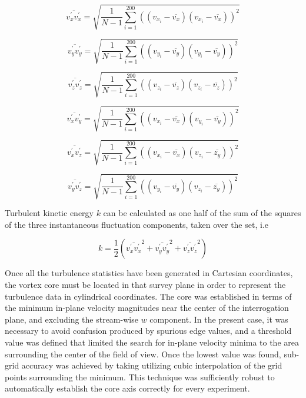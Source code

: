\begin{equation}
\overline{v_x^\prime v_x^\prime} = \sqrt{\frac{1}{N-1} \sum_{i=1}^{200} 
	((v_{x_i} - \overline{v_x})(v_{x_i} - \overline{v_x}))^2}
\label{eq:rs_uu}
\end{equation}

\begin{equation}
\overline{v_y^\prime v_y^\prime} = \sqrt{\frac{1}{N-1} \sum_{i=1}^{200} 
	((v_{y_i} - \overline{v_y})(v_{y_i} - \overline{v_y}))^2}
\end{equation}

\begin{equation}
\overline{v_z^\prime v_z^\prime} = \sqrt{\frac{1}{N-1} \sum_{i=1}^{200} 
	((v_{z_i} - \overline{v_z})(v_{z_i} - \overline{v_z}))^2}
\end{equation}

\begin{equation}
\overline{v_x^\prime v_y^\prime} = \sqrt{\frac{1}{N-1} \sum_{i=1}^{200} 
	((v_{x_i} - \overline{v_x})(v_{y_i} - \overline{v_y}))^2}
\end{equation}

\begin{equation}
\overline{v_x^\prime v_z^\prime} = \sqrt{\frac{1}{N-1} \sum_{i=1}^{200} 
	((v_{x_i} - \overline{v_x})(v_{z_i} - \overline{z_y}))^2}
\end{equation}

\begin{equation}
\overline{v_y^\prime v_z^\prime} = \sqrt{\frac{1}{N-1} \sum_{i=1}^{200} 
	((v_{y_i} - \overline{v_y})(v_{z_i} - \overline{z_y}))^2}
\label{eq:rs_vw}
\end{equation}

Turbulent kinetic energy $k$ can be calculated as one half of the sum of the 
squares of the three instantaneous fluctuation components, taken over the set, 
i.e

\begin{equation}
k = \frac{1}{2} \left(\overline{v_x^\prime v_x^\prime}^2 + 
	\overline{v_y^\prime v_y^\prime}^2 + 
	\overline{v_z^\prime v_z^\prime}^2\right)
\label{eq:tke}
\end{equation}


Once all the turbulence statistics have been 
generated in Cartesian coordinates, the 
vortex core must be located in that survey plane in order to represent the 
turbulence data in cylindrical coordinates. The core was established in terms 
of the minimum in-plane velocity magnitudes near the center of the 
interrogation plane, and excluding the stream-wise $w$ component. In the 
present case, it was necessary to avoid confusion produced by spurious edge 
values, and a threshold value was defined that limited the search for in-plane 
velocity minima to the area surrounding the center of the field of view. Once 
the lowest value was found, sub-grid accuracy was 
achieved by taking utilizing cubic interpolation of the grid points surrounding 
the minimum. This technique was sufficiently robust to automatically establish 
the core axis correctly for every experiment.


